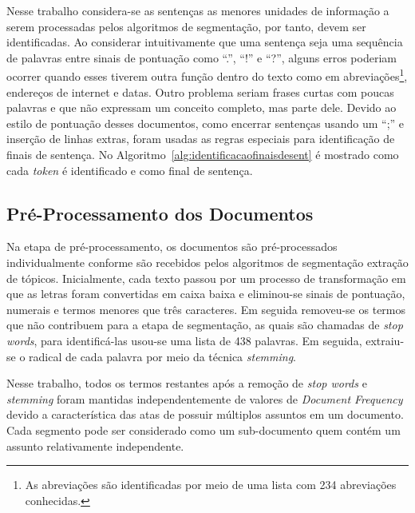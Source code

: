 Nesse trabalho considera-se as sentenças as menores unidades de informação a serem processadas pelos algoritmos de segmentação, por tanto, devem ser identificadas. Ao considerar intuitivamente que uma sentença seja uma sequência de palavras entre sinais de pontuação como ``.'', ``!'' e ``?'', alguns erros poderiam ocorrer quando esses tiverem outra função dentro do texto como em abreviações\footnote{As abreviações são identificadas por meio de uma lista com 234 abreviações conhecidas.}, endereços de internet e datas. Outro problema seriam frases curtas com poucas palavras e que não expressam um conceito completo, mas parte dele. Devido ao estilo de pontuação desses documentos, como encerrar sentenças usando um ``;'' e inserção de linhas extras, foram usadas as regras especiais para identificação de finais de sentença. No Algoritmo~\ref{alg:identificacaofinaisdesent} é mostrado como cada \textit{token} é identificado e como final de sentença.  %







\subsection{Pré-Processamento dos Documentos}


Na etapa de pré-processamento, os documentos são pré-processados individualmente conforme são recebidos pelos algoritmos de segmentação extração de tópicos. Inicialmente, cada texto passou por um processo de transformação em que as letras foram convertidas em caixa baixa e eliminou-se sinais de pontuação, numerais e termos menores que três caracteres. Em seguida removeu-se os termos que não contribuem para a etapa de segmentação, as quais são chamadas de \textit{stop words}, para identificá-las usou-se uma lista de 438 palavras. Em seguida, extraiu-se o radical de cada palavra por meio da técnica \textit{stemming}. 

Nesse trabalho, todos os termos restantes após a remoção de \textit{stop words} e \textit{stemming} foram mantidas independentemente de valores de   \textit{Document Frequency} devido a característica das atas de possuir múltiplos assuntos em um documento. Cada segmento pode ser considerado como um sub-documento quem contém um assunto relativamente independente. 







